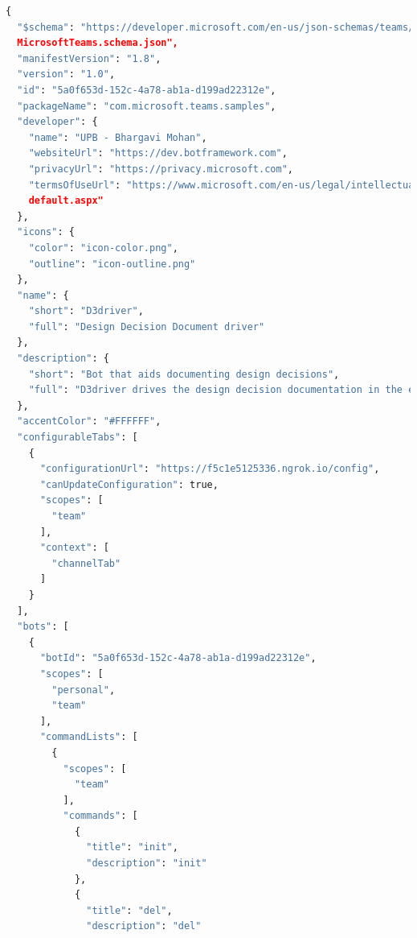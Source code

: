 \begin{lstlisting}[caption={Manifest file},label={lst:manifest},language=python]
{
  "$schema": "https://developer.microsoft.com/en-us/json-schemas/teams/v1.8/
  MicrosoftTeams.schema.json",
  "manifestVersion": "1.8",
  "version": "1.0",
  "id": "5a0f653d-152c-4a78-ab1a-d199ad22312e",
  "packageName": "com.microsoft.teams.samples",
  "developer": {
    "name": "UPB - Bhargavi Mohan",
    "websiteUrl": "https://dev.botframework.com",
    "privacyUrl": "https://privacy.microsoft.com",
    "termsOfUseUrl": "https://www.microsoft.com/en-us/legal/intellectualproperty/copyright/
    default.aspx"
  },
  "icons": {
    "color": "icon-color.png",
    "outline": "icon-outline.png"
  },
  "name": {
    "short": "D3driver",
    "full": "Design Decision Document driver"
  },
  "description": {
    "short": "Bot that aids documenting design decisions",
    "full": "D3driver drives the design decision documentation in the easiest way possible. This bot is exclusively designed to be used in a Mechatronics team. The design phase is an integral step in systems engineering domain. In an inter-disciplinary team, the design stage during the lifecycle of a product is extended across different phases of V-model and hence the design decisions are made throughout architectural design phase , conceptual design phase and even during the implementation phase. All these design decisions and decision makers should be distinguished from regualar or unimportant discussions that happen within a team and put together for later quick access and that is exactly what D3driver assists the users with. D3driver installs a messaging extension and a tab. The messaging extension is to access decision cards where user can choose from which phase of the V-model does the user want to document the design decisions. The tab serves like a dashboard that displays all the design decisions discusssed in a team."
  },
  "accentColor": "#FFFFFF",
  "configurableTabs": [
    {
      "configurationUrl": "https://f5c1e5125336.ngrok.io/config",
      "canUpdateConfiguration": true,
      "scopes": [
        "team"
      ],
      "context": [
        "channelTab"
      ]
    }
  ],
  "bots": [
    {
      "botId": "5a0f653d-152c-4a78-ab1a-d199ad22312e",
      "scopes": [
        "personal",
        "team"
      ],
      "commandLists": [
        {
          "scopes": [
            "team"
          ],
          "commands": [
            {
              "title": "init",
              "description": "init"
            },
            {
              "title": "del",
              "description": "del"

\end{lstlisting}
